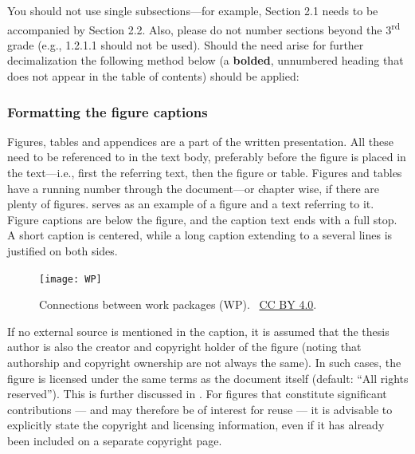 You should not use single subsections---for example, Section 2.1
needs to be accompanied by Section 2.2. Also, please do not number
sections beyond the 3\textsuperscript{rd}  grade (e.g., 1.2.1.1
should not be used). Should the need arise for further decimalization
the following method below (a \textbf{bolded}, unnumbered heading
that does not appear in the table of contents) should be applied:

\subsubsection{Formatting the figure captions}
Figures, tables and appendices are a part of the written
presentation. All these need to be referenced to in the text body,
preferably before the figure is placed in the text---i.e., first the
referring text, then the figure or table. Figures and tables have a
running number through the document---or chapter wise, if there are
plenty of figures.  serves as an example of a figure and a
text referring to it. Figure captions are below the figure, and the
caption text ends with a full stop. A short caption is centered,
while a long caption extending to a several lines is justified on both sides.

\begin{figure}[ht]
\begin{center}
  \texttt{[image: WP]}
\end{center}
\caption{Connections between work packages (WP).
  \copyrightstring\ \href{https://creativecommons.org/licenses/by/4.0/}{CC
BY 4.0}.}
\label{fig:work_packages}
\end{figure}

If no external source is mentioned in the caption, it is assumed that
the thesis author is also the creator and copyright holder of the
figure (noting that authorship and copyright ownership are not always
the same). In such cases, the figure is licensed under the same terms
as the document itself (default: “All rights reserved”). This is
further discussed in . For figures that constitute
significant contributions — and may therefore be of interest for
reuse — it is advisable to explicitly state the copyright and
licensing information, even if it has already been included on a separate
copyright page.

